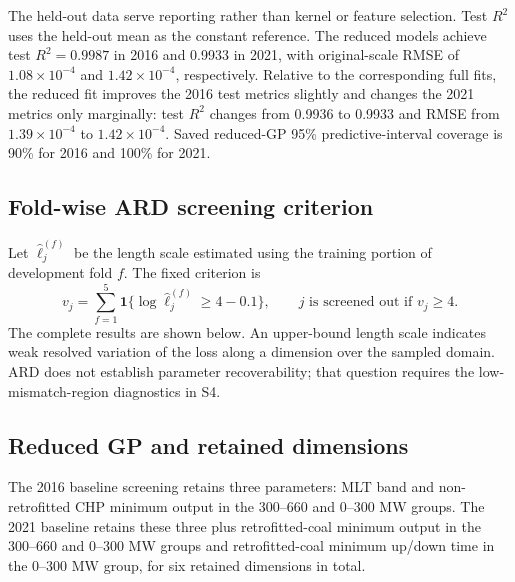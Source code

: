 \documentclass[11pt,a4paper]{article}
\begin{document}
The held-out data serve reporting rather than kernel or feature selection.
Test $R^2$ uses the held-out mean as the constant reference. The reduced models
achieve test $R^2=0.9987$ in 2016 and 0.9933 in 2021, with original-scale
RMSE of $1.08\times10^{-4}$ and $1.42\times10^{-4}$, respectively. Relative
to the corresponding full fits, the reduced fit improves the 2016 test metrics
slightly and changes the 2021 metrics only marginally: test $R^2$ changes from
0.9936 to 0.9933 and RMSE from $1.39\times10^{-4}$ to $1.42\times10^{-4}$.
Saved reduced-GP 95\% predictive-interval coverage is 90\% for 2016 and
100\% for 2021.

\newpage
\subsection{Fold-wise ARD screening criterion}
Let $\widehat\ell_j^{(f)}$ be the length scale estimated using the training
portion of development fold $f$. The fixed criterion is
\begin{equation}
v_j=\sum_{f=1}^{5}\mathbf1\{\log\widehat\ell_j^{(f)}\ge4-0.1\},
\qquad j\text{ is screened out if }v_j\ge4.
\end{equation}
The complete results are shown below. An upper-bound length scale indicates
weak resolved variation of the loss along a dimension over the sampled domain.
ARD does not establish parameter recoverability; that question requires the
low-mismatch-region diagnostics in S4.

\begin{center}
\label{tab:ard}
\fontsize{8.5}{10.3}\selectfont
\setlength{\tabcolsep}{4pt}\renewcommand{\arraystretch}{1.10}

\end{center}

\subsection{Reduced GP and retained dimensions}
The 2016 baseline screening retains three parameters: MLT band and
non-retrofitted CHP minimum output in the 300--660 and 0--300 MW groups.
The 2021 baseline retains these three plus retrofitted-coal minimum output
in the 300--660 and 0--300 MW groups and retrofitted-coal minimum up/down
time in the 0--300 MW group, for six retained dimensions in total.
\end{document}
